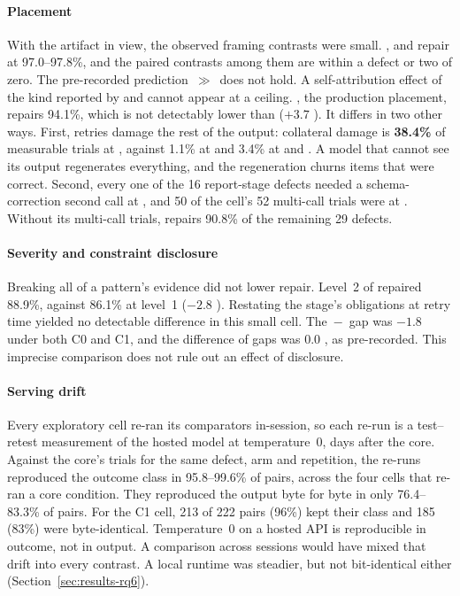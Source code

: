 \paragraph{Placement}
With the artifact in view, the observed framing contrasts were small. ,  and
 repair at 97.0--97.8\%, and the paired contrasts among them are within
a defect or two of zero. The pre-recorded prediction
\,$\gg$\, does not hold. A self-attribution effect of the kind
reported by \citet{tsui2026scbench} and \citet{chen2026rolerelabel} cannot
appear at a ceiling. , the production placement, repairs 94.1\%, which
is not detectably lower than  ($+3.7$\pp{} ). It differs
in two other ways. First,  retries damage the rest of the output:
collateral damage is \textbf{38.4\%} of measurable trials at , against
1.1\% at  and 3.4\% at  and . A model that cannot see
its output regenerates everything, and the regeneration churns items that were
correct. Second, every one of the 16 report-stage defects needed a
schema-correction second call at , and 50 of the cell's 52 multi-call
trials were at . Without its multi-call trials,  repairs 90.8\%
 of the remaining 29 defects.

\paragraph{Severity and constraint disclosure}
Breaking all of a pattern's evidence did not lower repair. Level~2 of 
repaired 88.9\%, against 86.1\% at level~1 ($-2.8$\pp{} ).
Restating the stage's obligations at retry time yielded no detectable difference in this small cell. The
\,$-$\, gap was $-1.8$\pp{} under both C0 and C1, and the
difference of gaps was 0.0\pp{} , as pre-recorded. This imprecise comparison does not rule out an effect of disclosure.

\paragraph{Serving drift}
Every exploratory cell re-ran its comparators in-session, so each re-run is a
test--retest measurement of the hosted model at temperature~0, days after the
core. Against the core's trials for the same defect, arm and repetition, the
re-runs reproduced the outcome class in 95.8--99.6\% of pairs, across the four
cells that re-ran a core condition. They reproduced the output byte for byte in
only 76.4--83.3\% of pairs. For the C1 cell, 213 of 222 pairs (96\%) kept their
class and 185 (83\%) were byte-identical. Temperature~0 on a hosted API is
reproducible in outcome, not in output. A comparison across sessions would have
mixed that drift into every contrast. A local runtime was steadier, but not
bit-identical either (Section~\ref{sec:results-rq6}).

